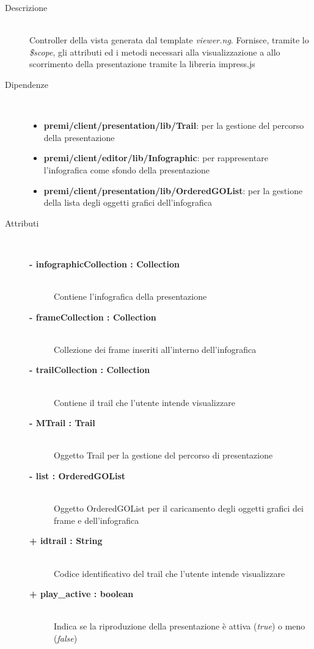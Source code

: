 \begin{description}
\item[Descrizione] \hfill \\
	Controller della vista generata dal template \textit{viewer.ng}. Fornisce, tramite lo \textit{\$scope}, gli attributi ed i metodi necessari alla visualizzazione a allo scorrimento della presentazione tramite la libreria impress.js
	
	
	
\item[Dipendenze] \hfill \\
	\begin{itemize}
		\item \textbf{premi/client/presentation/lib/Trail}: per la gestione del percorso della presentazione
		\item \textbf{premi/client/editor/lib/Infographic}: per rappresentare l'infografica come sfondo della presentazione
		\item \textbf{premi/client/presentation/lib/OrderedGOList}: per la gestione della lista degli oggetti grafici dell'infografica
	\end{itemize}
	
	
\item[Attributi] \hfill \\
	\begin{description}
		\item[\textbf{- infographicCollection : Collection			}] \hfill \\
			Contiene l'infografica della presentazione
		\item[\textbf{- frameCollection : Collection			}] \hfill \\
			Collezione dei frame inseriti all'interno dell'infografica
		\item[\textbf{- trailCollection : Collection			}] \hfill \\
			Contiene il trail che l'utente intende visualizzare
		\item[\textbf{- MTrail : Trail			}] \hfill \\
			Oggetto Trail per la gestione del percorso di presentazione
		\item[\textbf{- list : OrderedGOList			}] \hfill \\
			Oggetto OrderedGOList per il caricamento degli oggetti grafici dei frame e dell'infografica
		\item[\textbf{+ idtrail : String			}] \hfill \\
			Codice identificativo del trail che l'utente intende visualizzare
		\item[\textbf{+ play\_active : boolean			}] \hfill \\
			Indica se la riproduzione della presentazione è attiva (\textit{true}) o meno (\textit{false})
	\end{description}
	

\end{description}
